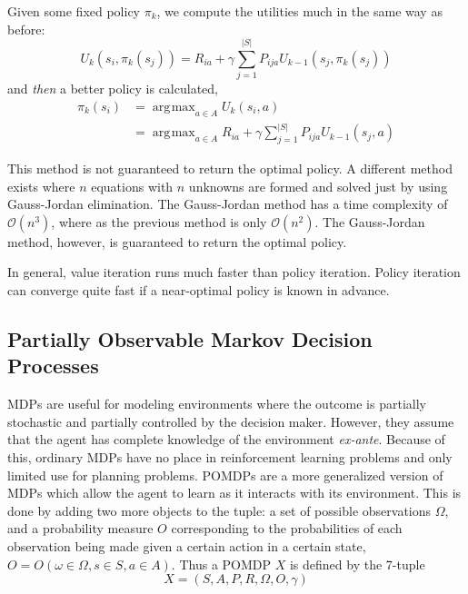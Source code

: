 \documentclass[tog]{acmsiggraph}
\DeclareMathOperator*{\argmax}{\arg\!\max}
\begin{document}
Given some fixed policy $\pi_k$, we compute the utilities much in the same way as before:
\begin{equation*}
    U_k \left( s_i, \pi_k \left( s_j \right) \right) = R_{ia} + \gamma \sum_{j=1}^{\left| S \right|} P_{ija} U_{k-1} \left( s_j, \pi_k \left( s_j \right) \right)
\end{equation*}
and \textit{then} a better policy is calculated,
\begin{equation*}
  \begin{split}
    \pi_k \left(s_i \right) &= \argmax_{a \in A} U_k \left( s_i, a \right) \\
    &= \argmax_{a \in A}  R_{ia} + \gamma \sum_{j=1}^{\left| S \right|} P_{ija} U_{k-1} \left( s_j, a \right)
  \end{split}
\end{equation*}

This method is not guaranteed to return the optimal policy. A different method exists 
where $n$ equations with $n$ unknowns are formed and solved just by using Gauss-Jordan 
elimination. The Gauss-Jordan method has a time complexity of $\mathcal{O} \left( n^3 \right)$, 
where as the previous method is only $\mathcal{O} \left( n^2 \right)$. The Gauss-Jordan 
method, however, is guaranteed to return the optimal policy.

In general, value iteration runs much faster than policy iteration. Policy iteration 
can converge quite fast if a near-optimal policy is known in advance.

\subsection{Partially Observable Markov Decision Processes}

MDPs are useful for modeling environments where the outcome is partially stochastic 
and partially controlled by the decision maker. However, they assume that the agent 
has complete knowledge of the environment \textit{ex-ante}. Because of this, ordinary 
MDPs have no place in reinforcement learning problems and only limited use for planning 
problems. POMDPs are a more generalized version of MDPs which allow the agent to learn 
as it interacts with its environment. This is done by adding two more objects to the tuple: 
a set of possible observations $\Omega$, and a probability measure $O$ corresponding to the 
probabilities of each observation being made given a certain action in a certain state, 
$O = O \left( \omega \in \Omega, s \in S, a \in A \right)$. Thus a POMDP $X$ is defined 
by the 7-tuple
\begin{equation*}
  X = \left(S, A, P, R, \Omega, O, \gamma \right)
\end{equation*}
\end{document}
